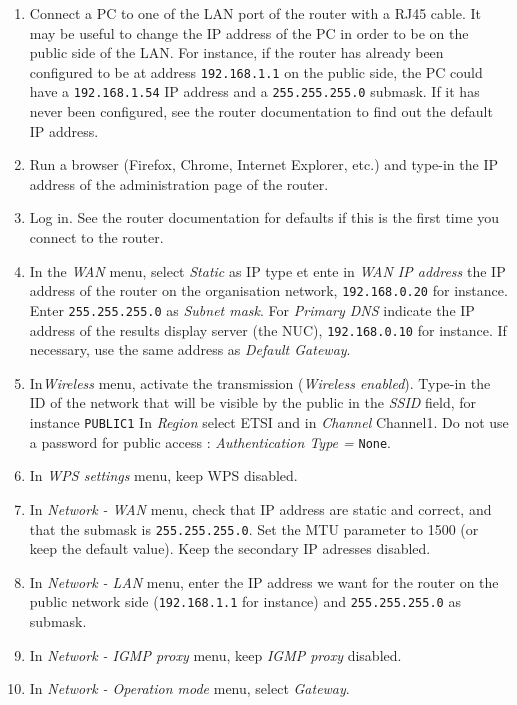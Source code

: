 \documentclass[a4paper]{ffco-rapport}
\begin{document}
	\begin{enumerate}
		\item Connect a PC to one of the LAN port of the router with a RJ45 cable.
					It may be useful to change the IP address of the PC in order to be on the public side of the LAN.
					For instance, if the router has already been configured to be at address \texttt{192.168.1.1} on the public side, the PC could have a \texttt{192.168.1.54} IP address and a \texttt{255.255.255.0} submask. If it has never been configured, see the router documentation to find out the default IP address.

		\item Run a browser (Firefox, Chrome, Internet Explorer, etc.) and type-in the IP address of the administration page of the router.
		\item Log in. See the router documentation for defaults if this is the first time you connect to the router.
		\item In the \emph{WAN} menu, select \emph{Static} as IP type et ente in \emph{WAN IP address} the IP address of the router on the organisation network, \texttt{192.168.0.20} for instance. Enter \texttt{255.255.255.0} as \emph{Subnet mask}.
					For \emph{Primary DNS} indicate the IP address of the results display server (the NUC), \texttt{192.168.0.10} for instance.
					If necessary, use the same address as \emph{Default Gateway}.
		\item In\emph{Wireless} menu, activate the transmission (\emph{Wireless enabled}).
					Type-in the ID of the network that will be visible by the public in the \emph{SSID} field, for instance \texttt{PUBLIC1}
					In \emph{Region} select ETSI and in \emph{Channel} Channel1. Do not use a password for public access : \emph{Authentication Type =} \texttt{None}.
		\item In \emph{WPS settings} menu, keep WPS disabled.
		\item In \emph{Network - WAN} menu, check that IP address are static and correct, and that the submask is \texttt{255.255.255.0}.
					Set the MTU parameter to 1500 (or keep the default value).
					Keep the secondary IP adresses disabled.
		\item In \emph{Network - LAN} menu, enter the IP address we want for the router on the public network side (\texttt{192.168.1.1} for instance) and  \texttt{255.255.255.0} as submask.
		\item In \emph{Network - IGMP proxy} menu, keep \emph{IGMP proxy} disabled.
		\item In \emph{Network - Operation mode} menu, select \emph{Gateway}.

\end{enumerate}
\end{document}
